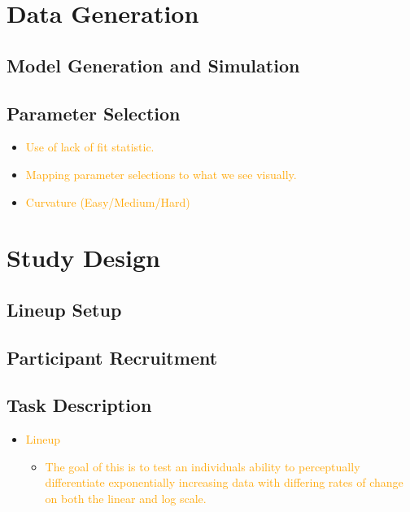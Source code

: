 \documentclass[]{interact}
\theoremstyle{plain}%
\theoremstyle{definition}
\theoremstyle{remark}
\begin{document}
\hypertarget{data-generation}{%
\section{Data Generation}\label{data-generation}}

\hypertarget{model-generation-and-simulation}{%
\subsection{Model Generation and
Simulation}\label{model-generation-and-simulation}}

\hypertarget{parameter-selection}{%
\subsection{Parameter Selection}\label{parameter-selection}}

\begin{itemize}
\item
  \textcolor{Orange}{Use of lack of fit statistic.}
\item
  \textcolor{Orange}{Mapping parameter selections to what we see visually.}
\item
  \textcolor{Orange}{Curvature (Easy/Medium/Hard)}
\end{itemize}

\hypertarget{study-design}{%
\section{Study Design}\label{study-design}}

\hypertarget{lineup-setup}{%
\subsection{Lineup Setup}\label{lineup-setup}}

\hypertarget{participant-recruitment}{%
\subsection{Participant Recruitment}\label{participant-recruitment}}

\hypertarget{task-description}{%
\subsection{Task Description}\label{task-description}}

\begin{itemize}
\item
  \textcolor{Orange}{Lineup}

  \begin{itemize}
  \item
    \textcolor{Orange}{The goal of this is to test an individuals ability to perceptually differentiate exponentially increasing data with differing rates of change on both the linear and log scale.}
  \end{itemize}
\end{itemize}
\end{document}
